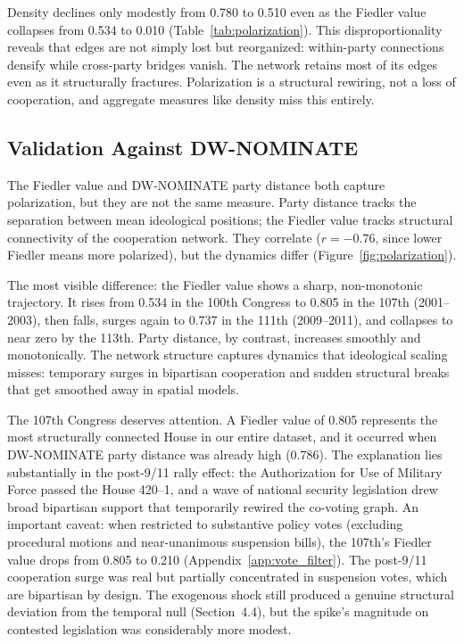 \documentclass[12pt, a4paper]{article}
\begin{document}
Density declines only modestly from 0.780 to 0.510 even as the Fiedler value collapses from 0.534 to 0.010 (Table~\ref{tab:polarization}). This disproportionality reveals that edges are not simply lost but reorganized: within-party connections densify while cross-party bridges vanish. The network retains most of its edges even as it structurally fractures. Polarization is a structural rewiring, not a loss of cooperation, and aggregate measures like density miss this entirely.

\subsection{Validation Against DW-NOMINATE}

The Fiedler value and DW-NOMINATE party distance both capture polarization, but they are not the same measure. Party distance tracks the separation between mean ideological positions; the Fiedler value tracks structural connectivity of the cooperation network. They correlate ($r = -0.76$, since lower Fiedler means more polarized), but the dynamics differ (Figure~\ref{fig:polarization}).

The most visible difference: the Fiedler value shows a sharp, non-monotonic trajectory. It rises from 0.534 in the 100th Congress to 0.805 in the 107th (2001--2003), then falls, surges again to 0.737 in the 111th (2009--2011), and collapses to near zero by the 113th. Party distance, by contrast, increases smoothly and monotonically. The network structure captures dynamics that ideological scaling misses: temporary surges in bipartisan cooperation and sudden structural breaks that get smoothed away in spatial models.

The 107th Congress deserves attention. A Fiedler value of 0.805 represents the most structurally connected House in our entire dataset, and it occurred when DW-NOMINATE party distance was already high (0.786). The explanation lies substantially in the post-9/11 rally effect: the Authorization for Use of Military Force passed the House 420--1, and a wave of national security legislation drew broad bipartisan support that temporarily rewired the co-voting graph. An important caveat: when restricted to substantive policy votes (excluding procedural motions and near-unanimous suspension bills), the 107th's Fiedler value drops from 0.805 to 0.210 (Appendix~\ref{app:vote_filter}). The post-9/11 cooperation surge was real but partially concentrated in suspension votes, which are bipartisan by design. The exogenous shock still produced a genuine structural deviation from the temporal null (Section~4.4), but the spike's magnitude on contested legislation was considerably more modest.
\end{document}
